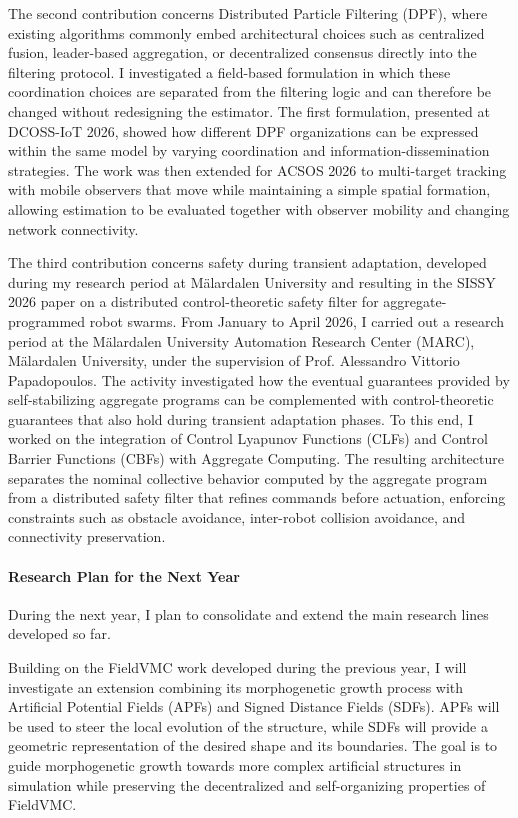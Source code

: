 \documentclass[11pt]{scrartcl}
\begin{document}
The second contribution concerns Distributed Particle Filtering (DPF), where existing algorithms commonly embed architectural choices such as centralized fusion, leader-based aggregation, or decentralized consensus directly into the filtering protocol.
%
I investigated a field-based formulation in which these coordination choices are separated from the filtering logic and can therefore be changed without redesigning the estimator.
%
The first formulation, presented at DCOSS-IoT 2026, showed how different DPF organizations can be expressed within the same model by varying coordination and information-dissemination strategies.
%
The work was then extended for ACSOS 2026 to multi-target tracking with mobile observers that move while maintaining a simple spatial formation, allowing estimation to be evaluated together with observer mobility and changing network connectivity.

The third contribution concerns safety during transient adaptation, developed during my research period at Mälardalen University and resulting in the SISSY 2026 paper on a distributed control-theoretic safety filter for aggregate-programmed robot swarms.
%
From January to April 2026, I carried out a research period at the Mälardalen University Automation Research Center (MARC), Mälardalen University, under the supervision of Prof. Alessandro Vittorio Papadopoulos.
%
The activity investigated how the eventual guarantees provided by self-stabilizing aggregate programs can be complemented with control-theoretic guarantees that also hold during transient adaptation phases.
%
To this end, I worked on the integration of Control Lyapunov Functions (CLFs) and Control Barrier Functions (CBFs) with Aggregate Computing.
%
The resulting architecture separates the nominal collective behavior computed by the aggregate program from a distributed safety filter that refines commands before actuation, enforcing constraints such as obstacle avoidance, inter-robot collision avoidance, and connectivity preservation.

\paragraph*{Research Plan for the Next Year}

During the next year, I plan to consolidate and extend the main research lines developed so far.

Building on the FieldVMC work developed during the previous year,
I will investigate an extension combining its morphogenetic growth process with Artificial Potential Fields (APFs)
and Signed Distance Fields (SDFs).
%
APFs will be used to steer the local evolution of the structure,
while SDFs will provide a geometric representation of the desired shape and its boundaries.
%
The goal is to guide morphogenetic growth towards more complex artificial structures in simulation while
preserving the decentralized and self-organizing properties of FieldVMC.
\end{document}
